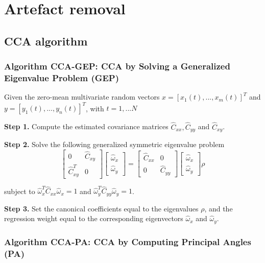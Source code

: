
\section{Artefact removal} 

\subsection{CCA algorithm}\label{ap1}

\subsubsection{Algorithm CCA-GEP: CCA by Solving a Generalized Eigenvalue Problem (GEP)}

Given the zero-mean multivariate random vectors $x=[x_1(t), ... , x_m(t)]^T$ and $y=[y_1(t), ... , y_n(t)]^T$, with $t=1, ... N$

\textbf{Step 1. }Compute the estimated covariance matrices  ${\hat{C}}_{xx}, {\hat{C}}_{yy}  $ and $ {\hat{C}}_{xy}$. 

\textbf{Step 2.} Solve the following generalized symmetric eigenvalue problem
\begin{equation}
\begin{bmatrix} 
0 & \hat{C}_{xy} \\
\hat{C}^{T}_{xy} & 0 
\end{bmatrix}
\begin{bmatrix} 
\hat{\omega}_x\\
\hat{\omega}_y
\end{bmatrix}=
\begin{bmatrix} 
\hat{C}_{xx} & 0 \\
0 & \hat{C}_{yy} 
\end{bmatrix}
\begin{bmatrix} 
\hat{\omega}_x\\
\hat{\omega}_y
\end{bmatrix}\rho
\end{equation}

subject to $\hat{\omega}^{T}_x{\hat{C}}_{xx}\hat{\omega}_x=1 $ and $ \hat{\omega}^T_y{\hat{C}}_{yy}\hat{\omega}_{y}=1$.

\textbf{Step 3.} Set the canonical coefficients equal to the eigenvalues $\rho$, and the regression weight equal to the corresponding eigenvectors $\hat{\omega}_x $ and $ \hat{\omega}_y$.



\subsubsection{Algorithm CCA-PA: CCA by Computing Principal Angles (PA)}



